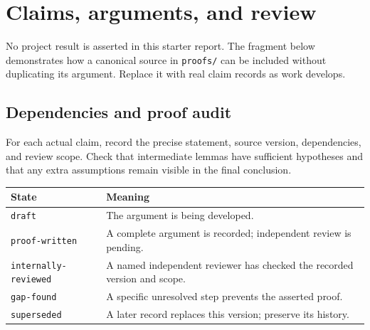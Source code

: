 \section{Claims, arguments, and review}\label{sec:results}

No project result is asserted in this starter report. The fragment below
demonstrates how a canonical source in \texttt{proofs/} can be included without
duplicating its argument. Replace it with real claim records as work develops.



\subsection{Dependencies and proof audit}
For each actual claim, record the precise statement, source version, dependencies,
and review scope. Check that intermediate lemmas have sufficient hypotheses and
that any extra assumptions remain visible in the final conclusion.

\noindent\begin{tabularx}{\textwidth}{@{}lY@{}}
\toprule
\textbf{State} & \textbf{Meaning} \\
\midrule
\texttt{draft} & The argument is being developed. \\
\texttt{proof-written} & A complete argument is recorded; independent review is pending. \\
\texttt{internally-reviewed} & A named independent reviewer has checked the recorded version and scope. \\
\texttt{gap-found} & A specific unresolved step prevents the asserted proof. \\
\texttt{superseded} & A later record replaces this version; preserve its history. \\
\bottomrule
\end{tabularx}

